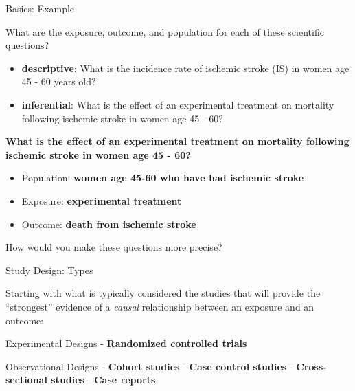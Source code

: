 \documentclass[ignorenonframetext,]{beamer}
\providecommand{\tightlist}{%
  \setlength{\itemsep}{0pt}\setlength{\parskip}{0pt}}
\begin{document}
\begin{frame}{Basics: Example}
\protect\hypertarget{basics-example-1}{}

What are the exposure, outcome, and population for each of these
scientific questions?

\begin{itemize}
\tightlist
\item
  \textbf{descriptive}: What is the incidence rate of ischemic stroke
  (IS) in women age 45 - 60 years old?
\item
  \textbf{inferential}: What is the effect of an experimental treatment
  on mortality following ischemic stroke in women age 45 - 60?
\end{itemize}

\textbf{What is the effect of an experimental treatment on mortality
following ischemic stroke in women age 45 - 60?}

\begin{itemize}
\tightlist
\item
  Population: \textbf{women age 45-60 who have had ischemic stroke}
\item
  Exposure: \textbf{experimental treatment}
\item
  Outcome: \textbf{death from ischemic stroke}
\end{itemize}

How would you make these questions more precise?

\end{frame}

\begin{frame}{Study Design: Types}
\protect\hypertarget{study-design-types}{}

Starting with what is typically considered the studies that will provide
the ``strongest'' evidence of a \emph{causal} relationship between an
exposure and an outcome:

Experimental Designs - \textbf{Randomized controlled trials}

Observational Designs - \textbf{Cohort studies} - \textbf{Case control
studies} - \textbf{Cross-sectional studies} - \textbf{Case reports}

\end{frame}
\end{document}
